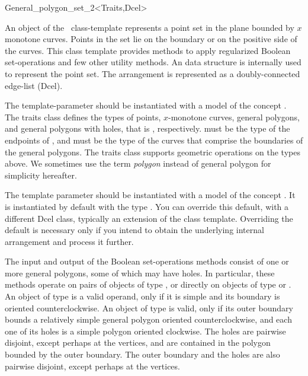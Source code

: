 \ccRefPageBegin

\begin{ccRefClass}{General_polygon_set_2<Traits,Dcel>}

\ccThreeToTwo
    
\ccDefinition
An object of the \ccClassTemplateName\ class-template represents a
point set in the plane bounded by $x$ monotone curves. Points in the set
lie on the boundary or on the positive side of the curves. This class 
template provides methods to apply regularized Boolean set-operations and 
few other utility methods. An  data structure is 
internally used to represent the point set. The arrangement is
represented as a doubly-connected edge-list ({\sc Dcel}).

The  template-parameter should be instantiated with a
model of the concept . The traits class
defines the types of points, $x$-monotone curves, general polygons,
and general polygons with holes, that is
, respectively.
 must 
be the type of the endpoints of
, and 
 must be the type of
the curves that comprise the boundaries of the general polygons. The traits
class supports geometric operations on the types above. We sometimes use
the term {\em polygon} instead of general polygon for simplicity hereafter.

The template parameter  should be instantiated with a
model of the concept . It is instantiated
by default with the type . You can override 
this default, with a different {\sc Dcel} class, typically an extension
of the  class template. Overriding the default is 
necessary only if you intend to obtain the underlying internal arrangement 
and process it further.

The input and output of the Boolean set-operations methods consist of one 
or more general polygons, some of which may have holes. In particular, 
these methods operate on pairs of objects of type \ccClassTemplateName, or
directly on objects of type  or 
. An object of type 
 is a valid operand, only if it
is simple and its boundary is oriented counterclockwise. An object of type
 is valid, only if 
its outer boundary bounds a relatively simple general polygon oriented
counterclockwise, and each one of its holes is a simple polygon oriented
clockwise. The holes are pairwise disjoint, except perhaps at the vertices,
and are contained in the polygon bounded by the outer boundary. The outer
boundary and the holes are also pairwise disjoint, except perhaps at the
vertices.


\end{ccRefClass}
